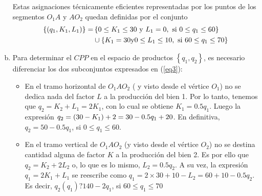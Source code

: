\begin{enumerate}[a)]
\begin{center}
			\end{center}
	Estas asignaciones técnicamente eficientes representadas por los puntos de los segmentos $O_1A$ y $AO_2$ quedan definidas por el conjunto
			\begin{align}
					\left\lbrace \left(q_1, K_1, L_1 \right) \right\rbrace = & \left\lbrace 0 \leq K_1 \leq 30 \text{ y } L_1 = 0, \text{ si } 0\leq q_1 \leq 60 \right\rbrace \notag \\
																		     & \cup \left\lbrace K_1 = 30 \text{y} 0 \leq L_1 \leq 10, \text{ si } 60 \leq q_1 \leq 70\right\rbrace \label{eq3}
			\end{align}
	\item Para determinar el $CPP$ en el espacio de productos $\left\lbrace q_1, q_2 \right\rbrace $, es necesario diferenciar los dos subconjuntos expresados en (\ref{eq3}):
			\begin{itemize}
				\item En el tramo horizontal de $O_1AO_2$ ( y visto desde el vértice $O_1$) no se dedica nada del factor $L$ a la producción del bien 1. Por lo tanto, tenemos que $q_2 = K_2 + L_1 = 2K_1$, con lo cual se obtiene $K_1 = 0.5q_1$. Luego la expresión $q_2=(30-K_1) + 2\time 10 = 30 - 0.5q_1 +20$. En definitiva, $q_2 = 50 - 0.5q_1$, si $0\leq q_1 \leq 60$.
				\item En el tramo vertical de $O_1AO_2$ (y visto desde el vértice $O_2$) no se destina cantidad alguna de factor $K$ a la producción del bien 2. Es por ello que $q_2 = K_2 + 2L_2$ o, lo que es lo mismo, $L_2 = 0.5q_2$. A su vez, la expresión $q_1 = 2K_1 + L_1$ se reescribe como $q_1 = 2	\times 30 + 10 - L_2 = 60 + 10 - 0.5q_2$. Es decir, $q_2(q_1) ? 140 - 2q_1$, si $60 \leq q_1 \leq 70$

\end{itemize}
\end{enumerate}
